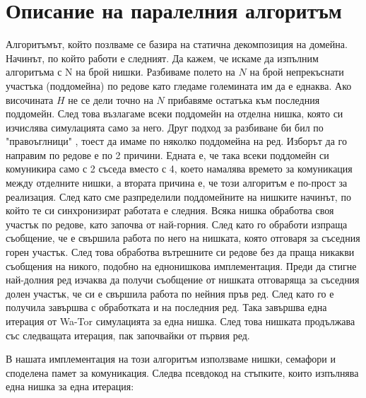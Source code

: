 \documentclass{article}
\begin{document}
\section{Описание на паралелния алгоритъм}
Алгоритъмът, който позлваме се базира на статична декомпозиция на домейна.
Начинът, по който работи е следният. Да кажем, че искаме да изпълним алгоритъма с N на брой нишки.
Разбиваме полето на $N$ на брой непрекъснати участъка (поддомейна) по редове като гледаме големината им
да е еднаква. Ако височината $H$ не се дели точно на $N$ прибавяме остатъка към последния поддомейн.
След това възлагаме всеки поддомейн на отделна нишка, която си изчислява симулацията само за него.
Друг подход за разбиване би бил по "правоъглници" , тоест да имаме по няколко поддомейна на ред.
Изборът да го направим по редове е по 2 причини. Едната е, че така всеки поддомейн си комуникира само
с 2 съседа вместо с 4, което намалява времето за комуникация между отделните нишки, а втората причина
е, че този алгоритъм е по-прост за реализация.
\bigbreak
След като сме разпределили поддомейните на нишките начинът, по който те си синхронизират работата е следния.
Всяка нишка обработва своя участък по редове, като започва от най-горния. След като го обработи изпраща
съобщение, че е свършила работа по него на нишката, която отговаря за съседния горен участък.
След това обработва вътрешните си редове без да праща никакви съобщения на никого, подобно на еднонишкова
имплементация. Преди да стигне най-долния ред изчаква да получи съобщение от нишката отговаряща за съседния
долен участък, че си е свършила работа по нейния пръв ред. След като го е получила завършва с обработката
и на последния ред. Така завършва една итерация от Wa-Tor симулацията за една нишка. След това нишката
продължава със следващата итерация, пак започвайки от първия ред.

В нашата имплементация на този алгоритъм използваме нишки, семафори и споделена памет за комуникация.
Следва псевдокод на стъпките, които изпълнява една нишка за една итерация:

\newpage
\end{document}

